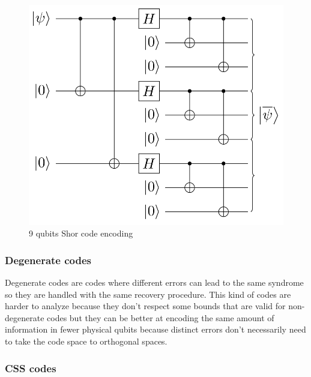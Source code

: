 \documentclass{article}
\begin{document}
\begin{figure}[H]
	\begin{center}
		\includegraphics[scale = 0.25]{shor-code-encode.png}
	\end{center}
	\caption{9 qubits Shor code encoding}\label{9sc}
\end{figure}


\subsubsection{Degenerate codes}

Degenerate codes are codes where different errors can lead to the same syndrome
so they are handled with the same recovery procedure.
This kind of codes are harder to analyze because they don't respect some bounds that are
valid for non-degenerate codes but they can be better at encoding the same amount of
information in fewer physical qubits because distinct errors don't necessarily need
to take the code space to orthogonal spaces.
\subsubsection{CSS codes}
\end{document}
